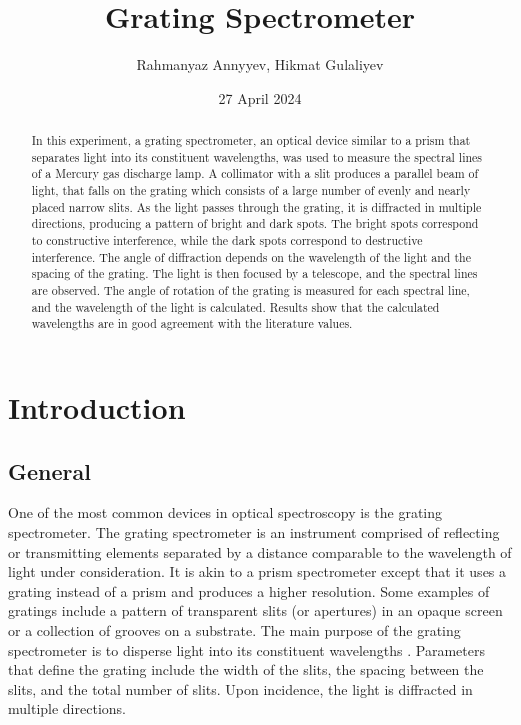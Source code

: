 \documentclass[10pt]{article}
\title{Grating Spectrometer}
\author{Rahmanyaz Annyyev, Hikmat Gulaliyev}
\date{27 April 2024}
\begin{document}
\maketitle

\begin{abstract}

In this experiment, a grating spectrometer, an optical device similar to a prism that separates light into its constituent wavelengths, was used to measure the spectral lines of a Mercury gas discharge lamp. A collimator with a slit produces a parallel beam of light, that falls on the grating which consists of a large number of evenly and nearly placed narrow slits. As the light passes through the grating, it is diffracted in multiple directions, producing a pattern of bright and dark spots. The bright spots correspond to constructive interference, while the dark spots correspond to destructive interference. The angle of diffraction depends on the wavelength of the light and the spacing of the grating. The light is then focused by a telescope, and the spectral lines are observed. The angle of rotation of the grating is measured for each spectral line, and the wavelength of the light is calculated. Results show that the calculated wavelengths are in good agreement with the literature values.

\end{abstract}

\section{Introduction}

\subsection*{General}

One of the most common devices in optical spectroscopy is the grating spectrometer. The grating spectrometer is an instrument comprised of reflecting or transmitting elements separated by a distance comparable to the wavelength of light under consideration. It is akin to a prism spectrometer except that it uses a grating instead of a prism and produces a higher resolution. Some examples of gratings include a pattern of transparent slits (or apertures) in an opaque screen or a collection of grooves on a substrate. The main purpose of the grating spectrometer is to disperse light into its constituent wavelengths \cite{Palmer_2020}. Parameters that define the grating include the width of the slits, the spacing between the slits, and the total number of slits. Upon incidence, the light is diffracted in multiple directions. 
\end{document}
